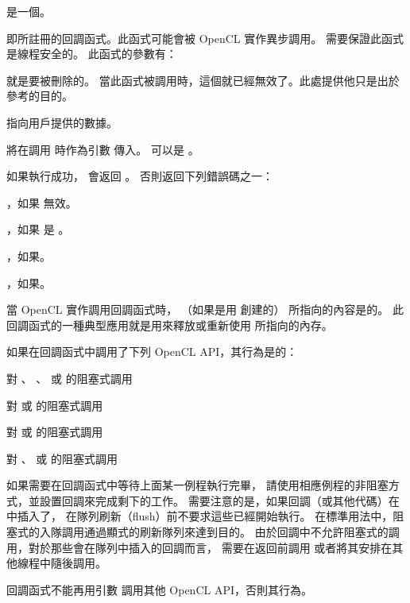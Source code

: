  是一個。

 即所註冊的回調函式。此函式可能會被 OpenCL 實作異步調用。
需要保證此函式是線程安全的。
此函式的參數有：
\startigBase
\item {} 就是要被刪除的。
當此函式被調用時，這個就已經無效了。此處提供他只是出於參考的目的。

\item {} 指向用戶提供的數據。
\stopigBase

 將在調用  時作為引數  傳入。
 可以是 。

如果執行成功，  會返回 。
否則返回下列錯誤碼之一：
\startigBase
\item {}，如果  無效。

\item {}，如果  是 。

\item {}，如果\scdevfailres。

\item {}，如果\schostfailres。
\stopigBase

\startnotepar
當 OpenCL 實作調用回調函式時，
 （如果是用  創建的）
所指向的內容是的。
此回調函式的一種典型應用就是用來釋放或重新使用  所指向的內存。

如果在回調函式中調用了下列 OpenCL API，其行為是的：
\startigBase
\item {}

\item {}

\item 對 、 、
 或  的阻塞式調用

\item 對  或  的阻塞式調用

\item 對  或  的阻塞式調用

\item 對 、 
或  的阻塞式調用
\stopigBase

如果需要在回調函式中等待上面某一例程執行完畢，
請使用相應例程的非阻塞方式，並設置回調來完成剩下的工作。
需要注意的是，如果回調（或其他代碼）在中插入了，
在隊列刷新（flush）前不要求這些已經開始執行。
在標準用法中，阻塞式的入隊調用通過顯式的刷新隊列來達到目的。
由於回調中不允許阻塞式的調用，對於那些會在隊列中插入的回調而言，
需要在返回前調用  或者將其安排在其他線程中隨後調用。

回調函式不能再用引數  調用其他 OpenCL API，否則其行為。
\stopnotepar
